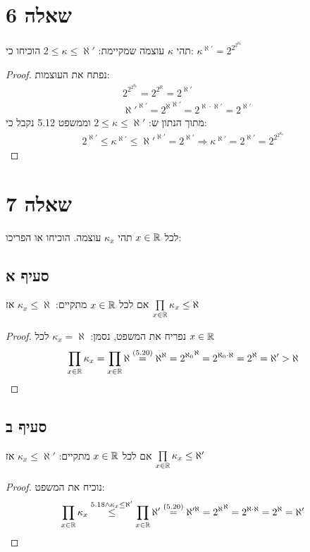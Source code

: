 \documentclass{article}
\begin{document}
	\section*{שאלה 6}
	תהי $\kappa$ עוצמה שמקיימת: $2 \leq \kappa \leq \aleph'$ הוכיחו כי: $\kappa^{\aleph'} = 2^{2^{2^{\aleph_0}}}$
	\begin{proof}
		נפתח את העוצמות:
		\begin{align*}
			&2^{2^{2^{\aleph_0}}}
			= 2^{2^{\aleph}}
			= 2^{\aleph'} \\
			&\aleph'^{\aleph'}
			= {2^{\aleph}}^{\aleph'}
			= 2^{\aleph \cdot \aleph'}
			= 2^{\aleph'}
		\end{align*}
		מתוך הנתון ש: $2 \leq \kappa \leq \aleph'$ וממשפט 5.12 נקבל כי:
		\begin{align*}
			2^{\aleph'} \leq \kappa^{\aleph'} \leq \aleph'^{\aleph'} = 2^{\aleph'}
			\Rightarrow \kappa^{\aleph'} = 2^{\aleph'} = 2^{2^{2^{\aleph_0}}}
		\end{align*}
	\end{proof}

	\section*{שאלה 7}
	לכל $x \in \mathbb{R}$ תהי $\kappa_x$ עוצמה. הוכיחו או הפריכו:

	\subsection*{סעיף א}
	אם לכל $x \in \mathbb{R}$ מתקיים: $\kappa_x \leq \aleph$ אז $\prod\limits_{x \in \mathbb{R}} \kappa_x \leq \aleph$
	\begin{proof}
		נפריח את המשפט, נסמן: $\kappa_x = \aleph$ לכל $x \in \mathbb{R}$
		\begin{align*}
			\prod\limits_{x \in \mathbb{R}} \kappa_x
			= \prod\limits_{x \in \mathbb{R}} \aleph
			\overset{(5.20)} = \aleph^{\aleph}
			= {2^{\aleph_0}}^{\aleph}
			= 2^{\aleph_0 \cdot {\aleph}}
			= 2^{\aleph} = \aleph' > \aleph
		\end{align*}
	\end{proof}

	\subsection*{סעיף ב}
	אם לכל $x \in \mathbb{R}$ מתקיים: $\kappa_x \leq \aleph'$ אז $\prod\limits_{x \in \mathbb{R}} \kappa_x \leq \aleph'$

	\begin{proof}
		נוכיח את המשפט:
		\begin{align*}
			\prod\limits_{x \in \mathbb{R}} \kappa_x
			\overset{5.18 \land \kappa_x \leq \aleph'}\leq \prod\limits_{x \in \mathbb{R}} \aleph'
			\overset{(5.20)} = \aleph'^{\aleph}
			= {2^{\aleph}}^{\aleph}
			= 2^{\aleph\cdot {\aleph}}
			= 2^{\aleph}
			= \aleph'
		\end{align*}
	\end{proof}
\end{document}
